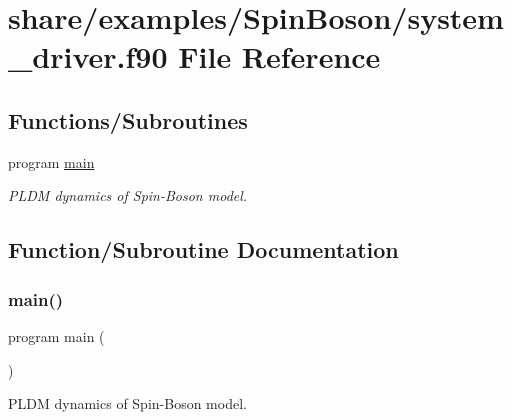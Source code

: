 \hypertarget{share_2examples_2_spin_boson_2system__driver_8f90}{}\section{share/examples/\+Spin\+Boson/system\+\_\+driver.f90 File Reference}
\label{share_2examples_2_spin_boson_2system__driver_8f90}
\subsection*{Functions/\+Subroutines}
\begin{DoxyCompactItemize}
\item 
program \hyperlink{share_2examples_2_spin_boson_2system__driver_8f90_a8ec2266d83cd6c0b762cbcbc92c0af3d}{main}
\begin{DoxyCompactList}\small\item\em P\+L\+DM dynamics of Spin-\/\+Boson model. \end{DoxyCompactList}\end{DoxyCompactItemize}


\subsection{Function/\+Subroutine Documentation}
\mbox{\label{share_2examples_2_spin_boson_2system__driver_8f90_a8ec2266d83cd6c0b762cbcbc92c0af3d}} 
\subsubsection{\texorpdfstring{main()}{main()}}
{\footnotesize\ttfamily program main (\begin{DoxyParamCaption}{ }\end{DoxyParamCaption})}



P\+L\+DM dynamics of Spin-\/\+Boson model. 

